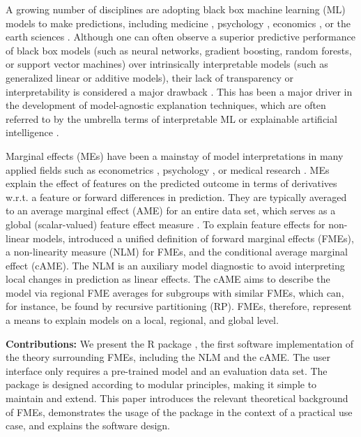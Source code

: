A growing number of disciplines are adopting black box machine learning (ML) models to make predictions, including medicine \citep{rajkomar_ml_medicine, boulesteix_ml_medicine}, psychology \citep{dwyer_psychology_ml}, economics \citep{mullainathan_econometrics_ml, athey_economics_ml}, or the earth sciences \citep{dueben_climate_ml}. Although one can often observe a superior predictive performance of black box models (such as neural networks, gradient boosting, random forests, or support vector machines) over intrinsically interpretable models (such as generalized linear or additive models), their lack of transparency or interpretability is considered a major drawback \citep{breiman_two_cultures}. This has been a major driver in the development of model-agnostic explanation techniques, which are often referred to by the umbrella terms of interpretable ML \citep{molnar_iml} or explainable artificial intelligence \citep{kamath_xai_book}.
\par
Marginal effects (MEs) \citep{williams_margins} have been a mainstay of model interpretations in many applied fields such as econometrics \citep{greene_econometric_analysis}, psychology \citep{mccabe_me_psychology}, or medical research \citep{onukwugha_me_primer}. MEs explain the effect of features on the predicted outcome in terms of derivatives w.r.t. a feature or forward differences in prediction. They are typically averaged to an average marginal effect (AME) for an entire data set, which serves as a global (scalar-valued) feature effect measure \citep{bartus_marginal_effects}. 
To explain feature effects for non-linear models, \citet{scholbeck_fme} introduced a unified definition of forward marginal effects (FMEs), a non-linearity measure (NLM) for FMEs, and the conditional average marginal effect (cAME).
The NLM is an auxiliary model diagnostic to avoid interpreting local changes in prediction as linear effects. The cAME aims to describe the model via regional FME averages for subgroups with similar FMEs, which can, for instance, be found by recursive partitioning (RP). FMEs, therefore, represent a means to explain models on a local, regional, and global level.
\par
\textbf{Contributions:} We present the R package , the first software implementation of the theory surrounding FMEs, including the NLM and the cAME. The user interface only requires a pre-trained model and an evaluation data set. The package is designed according to modular principles, making it simple to maintain and extend. This paper introduces the relevant theoretical background of FMEs, demonstrates the usage of the package in the context of a practical use case, and explains the software design.


